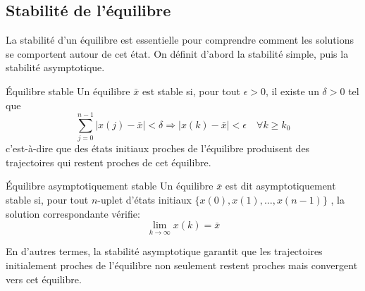         \subsection{Stabilité de l'équilibre}
            La stabilité d'un équilibre est essentielle pour comprendre comment les solutions se comportent autour de cet état. On définit d'abord la stabilité simple, puis la stabilité asymptotique.
            \begin{definition}{Équilibre stable}
                Un équilibre $\bar{x}$ est stable si, pour tout $\epsilon > 0$, il existe un $\delta > 0$ tel que
                \begin{equation}
                    \sum_{j=0}^{n-1} |x(j)-\bar{x}| < \delta \Rightarrow |x(k)-\bar{x}| < \epsilon \quad \forall k \geq k_0
                \end{equation}
                c'est-à-dire que des états initiaux proches de l'équilibre produisent des trajectoires qui restent proches de cet équilibre.
            \end{definition}
            \begin{definition}{Équilibre asymptotiquement stable}
                Un équilibre $\bar{x}$ est dit asymptotiquement stable si, pour tout $n$-uplet d'états initiaux $\{x(0), x(1), \dots, x(n-1)\}$ , la solution correspondante vérifie:
                \begin{equation}
                    \lim_{k \to \infty} x(k) = \bar{x}
                \end{equation}
            \end{definition}
            En d'autres termes, la stabilité asymptotique garantit que les trajectoires initialement proches de l'équilibre non seulement restent proches mais convergent vers cet équilibre. 
            
